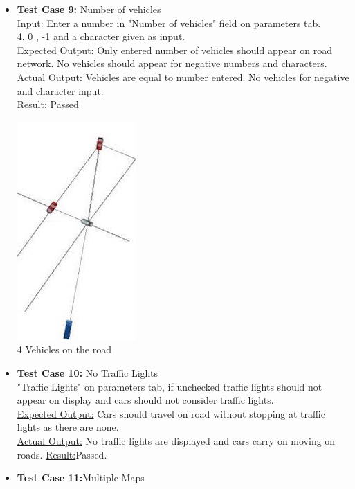 \documentclass[11pt]{article}
\begin{document}
\begin{enumerate}
\begin{itemize}
\item\textbf{Test Case 9:} Number of vehicles\hfill \\
\underline{Input:} Enter a number in "Number of vehicles" field on parameters tab.\hfill \\4, 0 , -1 and a character given as input.\hfill \\
\underline{Expected Output:} Only entered number of vehicles should appear on road network. No vehicles should appear for negative numbers and characters. \hfill \\
\underline{Actual Output:} Vehicles are equal to number entered. No vehicles for negative and character input.\hfil \\
\underline{Result:} Passed\hfill \\
\begin{table}[H]
\begin{center}
\includegraphics[scale=0.8]{4Cars}\hfill \\
4 Vehicles on the road
\end{center}
\end{table}
\item \textbf{Test Case 10:} No Traffic Lights\hfill \\
"Traffic Lights" on parameters tab, if unchecked traffic lights should not appear on display and cars should not consider traffic lights.\hfill \\
\underline{Expected Output:} Cars should travel on road without stopping at traffic lights as there are none.\hfill \\
\underline{Actual Output:} No traffic lights are displayed and cars carry on moving on roads.
\underline{Result:}Passed.\hfill \\ 
\item \textbf{Test Case 11:}Multiple Maps\hfill \\

\end{itemize}
\end{enumerate}
\end{document}
